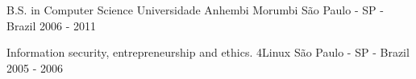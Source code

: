 

\begin{cventries}

  \cventry
    {B.S. in Computer Science} %
    {Universidade Anhembi Morumbi} %
    {São Paulo - SP - Brazil} %
    {2006 - 2011} %
    {}
    {}

    \cventry
    {Information security, entrepreneurship and ethics.} %
    {4Linux} %
    {São Paulo - SP - Brazil} %
    {2005 - 2006} %
    {}
    {}

\end{cventries}
